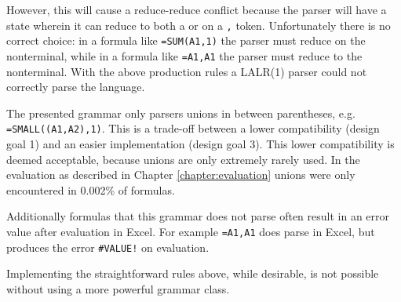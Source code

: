 However, this will cause a reduce-reduce conflict because the parser will have a state wherein it can reduce to both a  or  on a \texttt{,} token.
Unfortunately there is no correct choice: in a formula like \texttt{=SUM(A1,1)} the parser must reduce on the  nonterminal, while in a formula like \texttt{=A1,A1} the parser must reduce to the  nonterminal.
With the above production rules a LALR(1) parser could not correctly parse the language.

The presented grammar only parsers unions in between parentheses, e.g. \texttt{=SMALL((A1,A2),1)}.
This is a trade-off between a lower compatibility (design goal 1) and an easier implementation (design goal 3).
This lower compatibility is deemed acceptable, because unions are only extremely rarely used.
In the evaluation as described in Chapter \ref{chapter:evaluation} unions were only encountered in 0.002\% of formulas.

Additionally formulas that this grammar does not parse often result in an error value after evaluation in Excel.
For example \texttt{=A1,A1} does parse in Excel, but produces the error \texttt{\#VALUE!} on evaluation.

Implementing the straightforward rules above, while desirable, is not possible without using a more powerful grammar class.